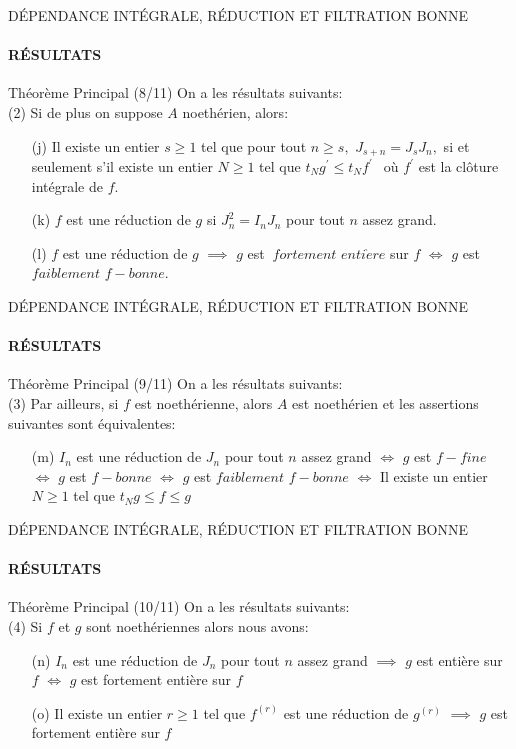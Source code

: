 \documentclass[11pt,a4paper]{beamer}
\begin{document}
\begin{frame}{DÉPENDANCE INTÉGRALE, RÉDUCTION ET FILTRATION BONNE}
	\framesubtitle{RÉSULTATS}
	\begin{block}{Théorème Principal (8/11)}
		On a les résultats suivants:\\
		(2) Si de plus on suppose $A$ noethérien, alors:
		\begin{enumerate}
			\item[(j)] Il existe un entier $s\geq 1$ tel que pour tout $n\geq s,$ $J_{s+n}=J_{s}J_{n},$ si et seulement s'il existe un entier $N\geq 1$ tel que $t_{N}g^{\prime }\leq
			t_{N}f^{\prime \text{ }}$ où $f^{\prime }$ est la clôture intégrale de $f.$
			
			\item[(k)] $f$ est une réduction de $g$ si $J_{n}^{2}=I_{n}J_{n}$ pour tout $n$ assez grand.
			
			\item[(l)] $f$ est une réduction de $g$ $\implies$ $g$ est $\ fortement$ $enti\grave{e}re$ sur $f$ $\Longleftrightarrow$ $g$ est $faiblement$ $f-bonne.$
		\end{enumerate}
	\end{block}
\end{frame}

\begin{frame}{DÉPENDANCE INTÉGRALE, RÉDUCTION ET FILTRATION BONNE}
	\framesubtitle{RÉSULTATS}
	\begin{block}{Théorème Principal (9/11)}
		On a les résultats suivants:\\
		(3) Par ailleurs, si $f$ est noethérienne, alors $A$ est noethérien et les assertions suivantes sont équivalentes:
		\begin{enumerate}
			\item[(m)] $I_{n}$ est une réduction de $J_{n}$ pour tout $n$ assez grand $\Longleftrightarrow$ $g$ est $f-fine$ $\Longleftrightarrow$ $g$ est $f-bonne$ $\Longleftrightarrow$ $g$ est $faiblement$ $f-bonne$ $\Longleftrightarrow$ Il existe un entier $N\geq 1$ tel que $t_{N}g\leq f\leq g$
		\end{enumerate}
	\end{block}
\end{frame}

\begin{frame}{DÉPENDANCE INTÉGRALE, RÉDUCTION ET FILTRATION BONNE}
	\framesubtitle{RÉSULTATS}
	\begin{block}{Théorème Principal (10/11)}
		On a les résultats suivants:\\
		(4) Si $f$ et $g$ sont noethériennes alors nous avons:
		\begin{enumerate}
			\item[(n)] $I_{n}$ est une réduction de $J_{n}$ pour tout $n$ assez grand $\implies$ $g$ est entière sur $f$ $\Longleftrightarrow$ $g$ est fortement entière sur $f$
			\item[(o)] Il existe un entier $r\geq 1$ tel que $f^{(r)}$ est une réduction de $g^{(r)}$ $\implies$ $g$ est fortement entière sur $f$
		\end{enumerate}
	\end{block}
\end{frame}
\end{document}
